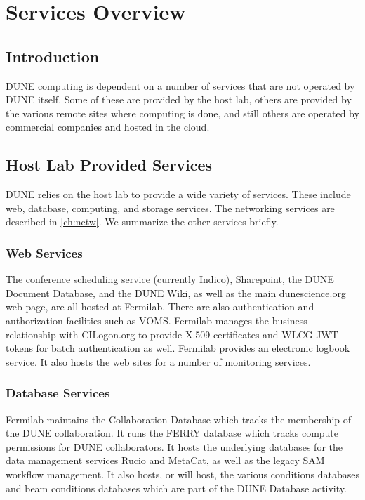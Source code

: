 \documentclass[../main-v1.tex]{subfiles}
\begin{document}
\chapter{Services Overview }
\label{ch:serv}

\section{Introduction}
DUNE computing is dependent on a number of services that are not operated by DUNE itself.
Some of these are provided by the host lab, others are provided by the various remote sites where
computing is done, and still others are operated by commercial companies and hosted in the cloud.

\section{Host Lab Provided Services}
DUNE relies on the host lab  to provide a wide variety of services.  These include web, database, computing, and storage services.  The networking services are described in \ref{ch:netw}.  We summarize the other services briefly.

\subsection{Web Services}
The conference scheduling service (currently Indico), Sharepoint, the DUNE Document Database, and the DUNE Wiki, as well as the main dunescience.org web page, are all hosted at Fermilab.  There are also authentication and authorization facilities such as VOMS.  Fermilab manages the business relationship with CILogon.org to provide X.509 certificates and WLCG JWT tokens for batch authentication as well.  Fermilab provides an electronic logbook service.  It also hosts the web sites for a number of monitoring services. 

\subsection{Database Services}
Fermilab maintains the Collaboration Database which tracks the membership of the DUNE collaboration.  It runs the FERRY 
database which tracks compute permissions for DUNE collaborators.  It hosts the underlying databases for the data management
services Rucio and MetaCat, as well as the legacy SAM workflow management. It also hosts, or will host, the various conditions databases and beam conditions databases which are part of the DUNE Database activity.
\end{document}
